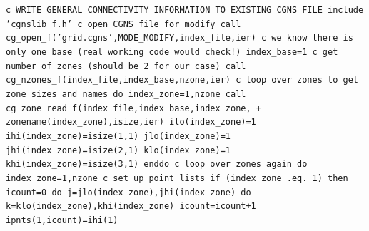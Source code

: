 \documentclass[12pt]{article}
\begin{document}
{\tt \noindent c  WRITE GENERAL CONNECTIVITY INFORMATION TO EXISTING CGNS FILE
\newline\indent      include 'cgnslib\_f.h'
\newline c  open CGNS file for modify
\newline\indent      call cg\_open\_f('grid.cgns',MODE\_MODIFY,index\_file,ier)
\newline c  we know there is only one base (real working code would check!)
\newline\indent      index\_base=1
\newline c   get number of zones (should be 2 for our case)
\newline\indent      call cg\_nzones\_f(index\_file,index\_base,nzone,ier)
\newline c   loop over zones to get zone sizes and names
\newline\indent      do index\_zone=1,nzone
\newline\indent\indent      call cg\_zone\_read\_f(index\_file,index\_base,index\_zone,
\newline \indent + \indent zonename(index\_zone),isize,ier)
\newline\indent\indent      ilo(index\_zone)=1
\newline\indent\indent      ihi(index\_zone)=isize(1,1)
\newline\indent\indent      jlo(index\_zone)=1
\newline\indent\indent      jhi(index\_zone)=isize(2,1)
\newline\indent\indent      klo(index\_zone)=1
\newline\indent\indent      khi(index\_zone)=isize(3,1)
\newline\indent      enddo
\newline c   loop over zones again
\newline\indent      do index\_zone=1,nzone
\newline c   set up point lists
\newline\indent\indent   if (index\_zone .eq. 1) then
\newline\indent\indent\indent   icount=0
\newline\indent\indent\indent   do j=jlo(index\_zone),jhi(index\_zone)
\newline\indent\indent\indent\indent     do k=klo(index\_zone),khi(index\_zone)
\newline\indent\indent\indent\indent\indent       icount=icount+1
\newline\indent\indent\indent\indent\indent       ipnts(1,icount)=ihi(1)
}
\end{document}
